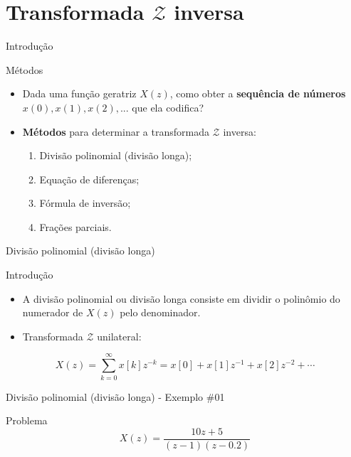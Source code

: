 \section{Transformada \texorpdfstring{$ \mathcal{Z} $}{Z} inversa}

\begin{frame}{Introdução}
\begin{block}{Métodos}
\begin{itemize}
	\item Dada uma função geratriz $X(z)$, como obter a \textbf{sequência de números} $x(0), x(1), x(2), ...$ que ela codifica?
	\item \textbf{Métodos} para determinar a transformada $\mathcal{Z}$ inversa:
	    \begin{enumerate}
        \item Divisão polinomial (divisão longa);
        \item Equação de diferenças;
        \item Fórmula de inversão;
        \item Frações parciais.
        \end{enumerate}
\end{itemize}
\end{block}
\end{frame}

\begin{frame}{Divisão polinomial (divisão longa)}
\begin{block}{Introdução}
\begin{itemize}
	\item A divisão polinomial ou divisão longa consiste em dividir o polinômio do numerador de $X(z)$ pelo denominador.
	\item Transformada $\mathcal{Z}$ unilateral:
\end{itemize}
$$X(z) = \sum_{k=0}^{\infty}x[k]z^{-k} = x[0] + x[1]z^{-1} + x[2]z^{-2} + \cdots $$
\end{block}
\end{frame}

\begin{frame}{Divisão polinomial (divisão longa) - Exemplo \#01}
\begin{block}{Problema}
	\[ X(z)=\dfrac{10z+5}{
		\left(z-1\right)
		\left(z-\num{0.2}\right)} \]
\end{block}
\end{frame}

